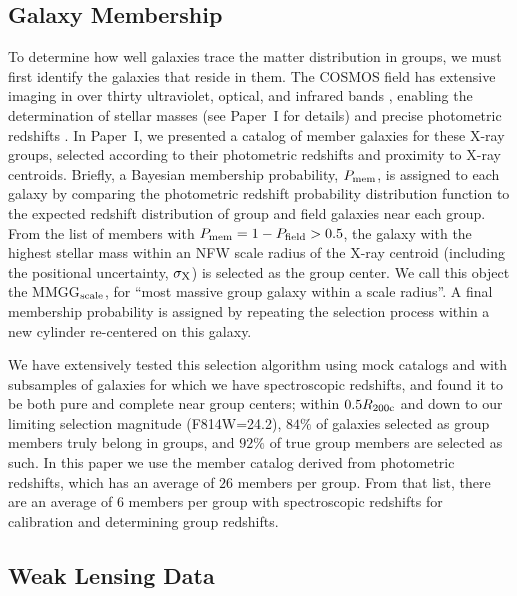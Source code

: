 \subsection{Galaxy Membership}
\label{cen_s:membership}

To determine how well galaxies trace the matter distribution in
groups, we must first identify the galaxies that reside in them. The
COSMOS field has extensive imaging in over thirty ultraviolet,
optical, and infrared bands \citep{Capak2007b}, enabling the
determination of stellar masses (see Paper~I for details) and precise
photometric redshifts \citep[][and Paper~I for further
tests]{Ilbert2009}. In Paper~I, we presented a catalog of member
galaxies for these X-ray groups, selected according to their
photometric redshifts and proximity to X-ray centroids. Briefly, a
Bayesian membership probability, $P_{\rm mem}$, is assigned to each
galaxy by comparing the photometric redshift probability distribution
function to the expected redshift distribution of group and field
galaxies near each group. From the list of members with $P_{\rm mem}=1-P_{\rm
  field}>0.5$, the galaxy with the highest stellar mass within an NFW
scale radius of the X-ray centroid (including the positional
uncertainty, $\sigma_{\rm X}$) is selected as the group center. We
call this object the MMGG$_{\rm scale}$, for ``most massive group galaxy
within a scale radius''. A final membership probability is assigned by
repeating the selection process within a new cylinder re-centered on
this galaxy.

We have extensively tested this selection algorithm using mock
catalogs and with subsamples of galaxies for which we have
spectroscopic redshifts, and found it to be both pure and complete
near group centers; within $0.5 R_{\rm 200c}$ and down to our limiting
selection magnitude (F814W=24.2), $84\%$ of galaxies selected as group
members truly belong in groups, and $92\%$ of true group members are
selected as such. In this paper we use the member catalog derived from
photometric redshifts, which has an average of $26$ members per
group. From that list, there are an average of $6$ members per group
with spectroscopic redshifts for calibration and determining group
redshifts.

\subsection{Weak Lensing Data}

